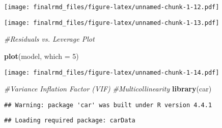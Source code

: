 \documentclass[
]{article}
\newenvironment{Shaded}{\begin{snugshade}}{\end{snugshade}}
\newcommand{\AttributeTok}[1]{\textcolor[rgb]{0.13,0.29,0.53}{#1}}
\newcommand{\CommentTok}[1]{\textcolor[rgb]{0.56,0.35,0.01}{\textit{#1}}}
\newcommand{\DecValTok}[1]{\textcolor[rgb]{0.00,0.00,0.81}{#1}}
\newcommand{\FunctionTok}[1]{\textcolor[rgb]{0.13,0.29,0.53}{\textbf{#1}}}
\newcommand{\NormalTok}[1]{#1}
\newcommand{\SpecialCharTok}[1]{\textcolor[rgb]{0.81,0.36,0.00}{\textbf{#1}}}
\newcommand{\StringTok}[1]{\textcolor[rgb]{0.31,0.60,0.02}{#1}}
\begin{document}
\texttt{[image: finalrmd\_files/figure-latex/unnamed-chunk-1-12.pdf]}

\begin{Shaded}
\end{Shaded}

\texttt{[image: finalrmd\_files/figure-latex/unnamed-chunk-1-13.pdf]}

\begin{Shaded}
\begin{Highlighting}[]
\CommentTok{\#Residuals vs. Leverage Plot}

\FunctionTok{plot}\NormalTok{(model, }\AttributeTok{which =} \DecValTok{5}\NormalTok{)}
\end{Highlighting}
\end{Shaded}

\texttt{[image: finalrmd\_files/figure-latex/unnamed-chunk-1-14.pdf]}

\begin{Shaded}
\begin{Highlighting}[]
\CommentTok{\#Variance Inflation Factor (VIF)}
\CommentTok{\#Multicollinearity}
\FunctionTok{library}\NormalTok{(car)}
\end{Highlighting}
\end{Shaded}

\begin{verbatim}
## Warning: package 'car' was built under R version 4.4.1
\end{verbatim}

\begin{verbatim}
## Loading required package: carData
\end{verbatim}
\end{document}
